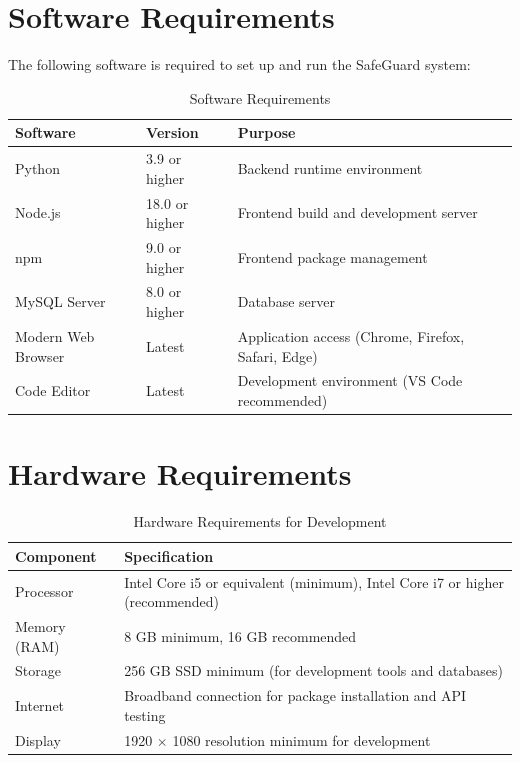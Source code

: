 \section{Software Requirements}

The following software is required to set up and run the SafeGuard system:

\begin{table}[H]
  \centering
  \caption{Software Requirements}
  \label{tab:software-req}
  \begin{tabularx}{\textwidth}{@{}l l X@{}}
    \toprule
    \textbf{Software} & \textbf{Version} & \textbf{Purpose} \\
    \midrule
    Python & 3.9 or higher & Backend runtime environment \\
    Node.js & 18.0 or higher & Frontend build and development server \\
    npm & 9.0 or higher & Frontend package management \\
    MySQL Server & 8.0 or higher & Database server \\
    Modern Web Browser & Latest & Application access (Chrome, Firefox, Safari, Edge) \\
    Code Editor & Latest & Development environment (VS Code recommended) \\
    \bottomrule
  \end{tabularx}
\end{table}

\section{Hardware Requirements}

\begin{table}[H]
  \centering
  \caption{Hardware Requirements for Development}
  \label{tab:hardware-req}
  \begin{tabularx}{\textwidth}{@{}l X@{}}
    \toprule
    \textbf{Component} & \textbf{Specification} \\
    \midrule
    Processor & Intel Core i5 or equivalent (minimum), Intel Core i7 or higher (recommended) \\
    Memory (RAM) & 8 GB minimum, 16 GB recommended \\
    Storage & 256 GB SSD minimum (for development tools and databases) \\
    Internet & Broadband connection for package installation and API testing \\
    Display & 1920 $\times$ 1080 resolution minimum for development \\
    \bottomrule
  \end{tabularx}
\end{table}

